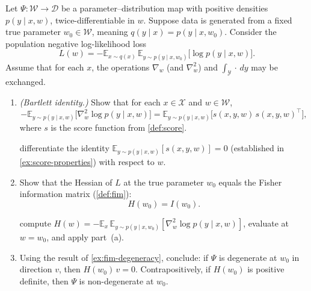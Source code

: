 \documentclass[11pt]{article}
\newcommand{\E}{\mathbb{E}}
\newcommand{\X}{\mathcal{X}}
\newcommand{\Y}{\mathcal{Y}}
\newcommand{\W}{\mathcal{W}}
\newcommand{\D}{\mathcal{D}}
\begin{document}
\begin{exercise}
\label{ex:fim-hessian}
    Let $\Psi : \W \to \D$ be a parameter--distribution map with positive
    densities $p(y \mid x, w)$, twice-differentiable in $w$. Suppose data is
    generated from a fixed true parameter $w_0 \in \W$, meaning
    $q(y \mid x) = p(y \mid x, w_0)$. Consider the population negative
    log-likelihood loss
    \begin{equation}
        L(w)
        = -\E_{x \sim q(x)}\,
            \E_{y \sim p(y \mid x, w_0)}\!\bigl[\log p(y \mid x, w)\bigr].
    \end{equation}
    Assume that for each $x$, the operations $\nabla_w$ (and $\nabla_w^2$)
    and $\int_\Y \cdot\, dy$ may be exchanged.
\begin{enumerate}
    \item
        \emph{(Bartlett identity.)}
        Show that for each $x \in \X$ and $w \in \W$,
        \begin{equation}\label{eq:bartlett}
            -\E_{y \sim p(y \mid x, w)}\!\bigl[
                \nabla_w^2 \log p(y \mid x, w)
            \bigr]
            =
            \E_{y \sim p(y \mid x, w)}\!\bigl[
                s(x,y,w)\, s(x,y,w)^\top
            \bigr],
        \end{equation}
        where $s$ is the score function from \cref{def:score}.
        \begin{hint}
differentiate the identity
            $\E_{y \sim p(y \mid x, w)}[s(x, y, w)] = 0$
            (established in \cref{ex:score-properties}) with respect to $w$.
        \end{hint}
    \item
        Show that the Hessian of $L$ at the true parameter $w_0$ equals the
        Fisher information matrix (\cref{def:fim}):
        \begin{equation}\label{eq:fim-hessian}
            H(w_0) = I(w_0).
        \end{equation}
        \begin{hint}
compute $H(w)
            = -\E_{x}\, \E_{y \sim p(y \mid x, w_0)}
                [\nabla_w^2 \log p(y \mid x, w)]$,
            evaluate at $w = w_0$, and apply part~(a).
        \end{hint}
    \item
        Using the result of \cref{ex:fim-degeneracy}, conclude: if $\Psi$ is
        degenerate at $w_0$ in direction $v$, then $H(w_0)\, v = 0$.
        Contrapositively, if $H(w_0)$ is positive definite, then $\Psi$ is
        non-degenerate at $w_0$.
\end{enumerate}
\end{exercise}
\end{document}
